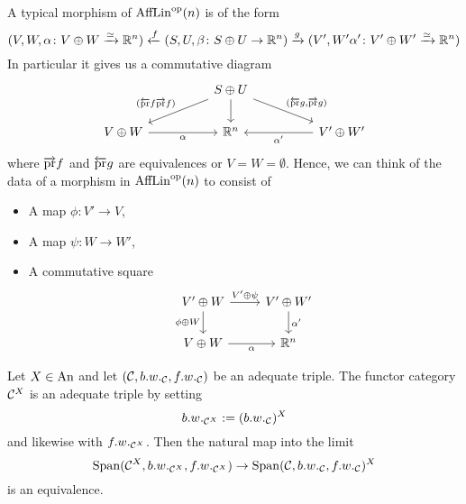 \begin{construction}
    A typical morphism of $\operatorname{AffLin}^{\mathrm{op}}(n)$ is of the form 
          \[
            (V,W,\alpha\colon  V\oplus W \xrightarrow{\simeq} \mathbb{R}^n) \xleftarrow{f}
            (S,U,\beta \colon S \oplus U \to \mathbb{R}^n) \xrightarrow{g}
            (V',W'\alpha' \colon V'\oplus W' \xrightarrow{\simeq} \mathbb{R}^n)  
          \]
          In particular it gives us a commutative diagram 
          \[\begin{tikzcd}
              && {S \oplus U} \\
              {V\oplus W} && {\R^n} && {V'\oplus W'}
              \arrow["{(\overleftarrow{\pr}g,\overrightarrow{\pr}g)}", from=1-3, to=2-5]
              \arrow["{(\overleftarrow{\pr}f\overrightarrow{\pr}f)}"', from=1-3, to=2-1]
              \arrow["{\alpha }"', from=2-1, to=2-3]
              \arrow[from=1-3, to=2-3]
              \arrow["{\alpha'}", from=2-5, to=2-3]
          \end{tikzcd}\]
          where $\overrightarrow{\mathrm{pr}}f$ and $\overleftarrow{\mathrm{pr}}g$ are equivalences or $V=W=\emptyset$.
          Hence, we can think of the data of a morphism in $\operatorname{AffLin}^{\mathrm{op}}(n)$ to 
          consist of  
          \begin{itemize}
              \item A map $\phi \colon V' \to V$,
              \item A map $\psi \colon W \to W'$,
              \item A commutative square 
              \[\begin{tikzcd}
                  {V'\oplus W} & {V'\oplus W'} \\
                  {V\oplus W} & {\R^n}
                  \arrow["\alpha"', from=2-1, to=2-2]
                  \arrow["{\alpha'}", from=1-2, to=2-2]
                  \arrow["{\phi\oplus W}"', from=1-1, to=2-1]
                  \arrow["{V'\oplus \psi}", from=1-1, to=1-2]
              \end{tikzcd}\]
          \end{itemize} 
\end{construction}

\begin{lemma}
    Let $X \in \operatorname{An}$ and let $(\mathcal{C}, b.w._{\mathcal{C}}, f.w._{\mathcal{C}})$ be an adequate triple. 
    The functor category $\mathcal{C}^X$ is an adequate triple by setting
    \[
    b.w._{\mathcal{C}^X} := (b.w._{\mathcal{C}})^X    
    \]    
    and likewise with $f.w._{\mathcal{C}^X}$.
    Then the natural map into the limit 
    \[
        \operatorname{Span}(\mathcal{C}^X, b.w._{\mathcal{C}^X}, f.w._{\mathcal{C}^X}) \to \operatorname{Span}(\mathcal{C},b.w._{\mathcal{C}}, f.w._{\mathcal{C}})^X
    \]
    is an equivalence.
\end{lemma}

